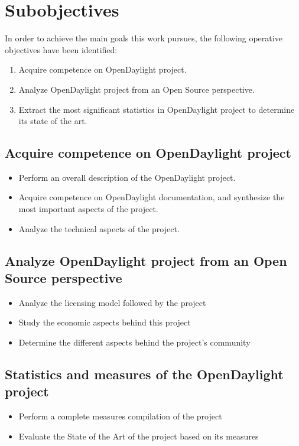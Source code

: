 \documentclass[a4paper, 12pt]{book}
\begin{document}
\section{Subobjectives}
\label{sec:subobj}

In order to achieve the main goals this work pursues, the following operative objectives have been identified:

\begin{enumerate}
\item{Acquire competence on OpenDaylight project.}
\item{Analyze OpenDaylight project from an Open Source perspective.}
\item{Extract the most significant statistics in OpenDaylight project to determine its state of the art.}
\end{enumerate}

\subsection{Acquire competence on OpenDaylight project}
\begin{itemize}
 \item Perform an overall description of the OpenDaylight project.
 \item Acquire competence on OpenDaylight documentation, and synthesize the most important aspects of the project.
 \item Analyze the technical aspects of the project.
\end{itemize}

\subsection{Analyze OpenDaylight project from an Open Source perspective}
\begin{itemize}
 \item Analyze the licensing model followed by the project
 \item Study the economic aspects behind this project
 \item Determine the different aspects behind the project's community
\end{itemize}

\subsection{Statistics and measures of the OpenDaylight project}
\begin{itemize}
 \item Perform a complete measures compilation of the project
 \item Evaluate the State of the Art of the project based on its measures
\end{itemize}
\end{document}

